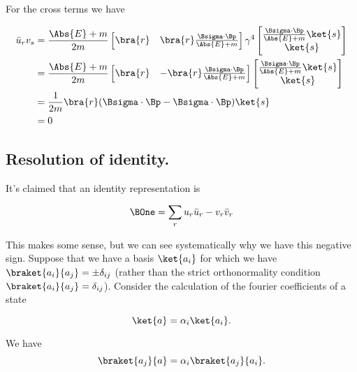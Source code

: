 For the cross terms we have

\begin{align*}
\bar{u}_r v_s 
&= 
\frac{\Abs{E} + m}{2m}
\begin{bmatrix}
\bra{r} &
\bra{r} \frac{\Bsigma \cdot \Bp}{\Abs{E} + m} 
\end{bmatrix}
\gamma^4
\begin{bmatrix}
\frac{\Bsigma \cdot \Bp}{\Abs{E} + m} \ket{s} \\
\ket{s} 
\end{bmatrix} \\
&= 
\frac{\Abs{E} + m}{2m}
\begin{bmatrix}
\bra{r} &
-\bra{r} \frac{\Bsigma \cdot \Bp}{\Abs{E} + m} 
\end{bmatrix}
\begin{bmatrix}
\frac{\Bsigma \cdot \Bp}{\Abs{E} + m} \ket{s} \\
\ket{s} 
\end{bmatrix} \\
&=
\frac{1}{2m}
\bra{r} ( \Bsigma \cdot \Bp - \Bsigma \cdot \Bp ) \ket{s} \\
&= 0
\end{align*}

\subsection{Resolution of identity.}

It's claimed that an identity representation is

\begin{equation}\label{eqn:desaiDiracAdjoint:540}
\BOne = \sum_r u_r \bar{u}_r - v_r \bar{v}_r
\end{equation}

This makes some sense, but we can see systematically why we have this negative sign.  Suppose that we have a basis $\ket{a_i}$ for which we have $\braket{a_i}{a_j} = \pm \delta_{ij}$ (rather than the strict orthonormality condition $\braket{a_i}{a_j} = \delta_{ij}$).  Consider the calculation of the fourier coefficients of a state

\begin{equation}\label{eqn:desaiDiracAdjoint:560}
\ket{a} = \alpha_i \ket{a_i}.
\end{equation}

We have 
\begin{equation}\label{eqn:desaiDiracAdjoint:580}
\braket{a_j}{a} = \alpha_i \braket{a_j}{a_i}.
\end{equation}

